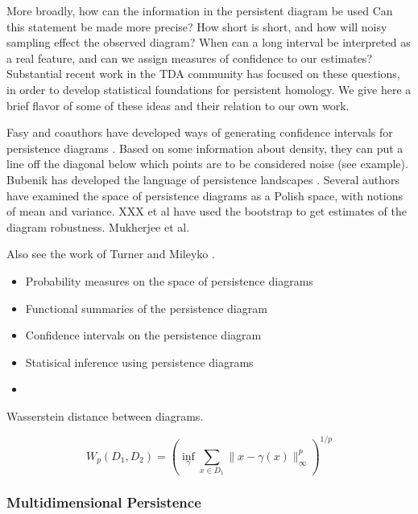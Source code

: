 More broadly, how can the information in the persistent diagram be used 
Can this statement be made more precise?
How short is short, and how will noisy sampling effect the observed diagram?
When can a long interval be interpreted as a real feature, and can we assign measures of confidence to our estimates?
Substantial recent work in the TDA community has focused on these questions, in order to develop statistical foundations for persistent homology.
We give here a brief flavor of some of these ideas and their relation to our own work.

Fasy and coauthors have developed ways of generating confidence intervals for persistence diagrams \citep{Fasy:2014}.
Based on some information about density, they can put a line off the diagonal below which points are to be considered noise (see example).
Bubenik has developed the language of persistence landscapes \cite{Bubenik:2007ux,Bubenik2015:um}.  
Several authors have examined the space of persistence diagrams as a Polish space, with notions of mean and variance.
XXX et al have used the bootstrap to get estimates of the diagram robustness.
Mukherjee et al.

Also see the work of Turner \cite{Turner:2012wb} and Mileyko \cite{Mileyko:2011jm}.

\begin{itemize}
\item Probability measures on the space of persistence diagrams
\item Functional summaries of the persistence diagram
\item Confidence intervals on the persistence diagram
\item Statisical inference using persistence diagrams
\item 
\end{itemize}

Wasserstein distance between diagrams.

\begin{equation}
W_{p}(D_{1},D_{2}) = \left( \inf_{\gamma} \sum_{x\in D_1} \|x-\gamma(x)\|^{p}_{\infty} \right)^{1/p}
\end{equation}


\subsubsection{Multidimensional Persistence}
\label{subsubsec:ph_multidim}

